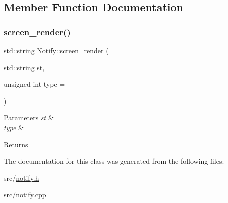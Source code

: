 \subsection{Member Function Documentation}
\mbox{\label{class_notify_a7055e1a2409ac4f55021e171ce6942e1}} 
\subsubsection{\texorpdfstring{screen\+\_\+render()}{screen\_render()}}
{\footnotesize\ttfamily std\+::string Notify\+::screen\+\_\+render (\begin{DoxyParamCaption}\item[{std\+::string}]{st,  }\item[{unsigned int}]{type = {} }\end{DoxyParamCaption})}


\begin{DoxyParams}{Parameters}
{\em st} & \\
\hline
{\em type} & \\
\hline
\end{DoxyParams}
\begin{DoxyReturn}{Returns}

\end{DoxyReturn}


The documentation for this class was generated from the following files\+:\begin{DoxyCompactItemize}
\item 
src/\mbox{\hyperlink{notify_8h}{notify.\+h}}\item 
src/\mbox{\hyperlink{notify_8cpp}{notify.\+cpp}}\end{DoxyCompactItemize}
